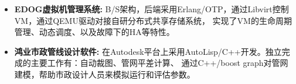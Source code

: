 \begin{itemize}[leftmargin=*]
      \item \textbf{EDOG虚拟机管理系统:} B/S架构，后端采用Erlang/OTP，通过Libvirt控制VM，通过QEMU驱动对接自研分布式共享存储系统，
          实现了VM的生命周期管理、动态调度、以及故障下的HA等特性。

      \item \textbf{鸿业市政管线设计软件:} 在Autodesk平台上采用AutoLisp/C++开发。独立完成的主要工作有：自动裁图、管网平差计算、
          通过C++/boost graph对管网建模，帮助市政设计人员来模拟运行和评估参数。

  \end{itemize}
